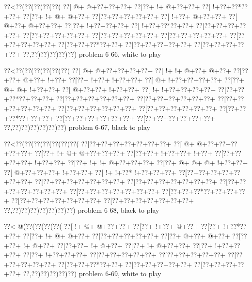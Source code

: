 \vbox{\vbox{\goo
\0??<\0??(\0??(\0??(\0??(\0??(
\0??[\- @+\- @+\0??+\0??+\0??+
\0??[\0??+\- !+\- @+\0??+\0??+
\0??[\- !+\0??+\0??*\0??+\0??+
\0??[\0??+\- !+\- @+\- @+\0??+
\0??[\0??+\0??+\0??+\0??+\0??+
\0??[\- !+\0??+\- @+\0??+\0??+
\0??[\- @+\0??+\- @+\0??+\0??+
\0??[\0??+\- !+\0??+\0??+\0??+
\0??[\- !+\0??+\0??*\0??+\0??+
\0??[\0??+\0??+\0??+\0??+\0??+
\0??[\0??+\0??+\0??+\0??+\0??+
\0??[\0??+\0??+\0??+\0??+\0??+
\0??[\0??+\0??+\0??+\0??+\0??+
\0??[\0??+\0??+\0??+\0??+\0??+
\0??[\0??+\0??+\0??*\0??+\0??+
\0??[\0??+\0??+\0??+\0??+\0??+
\0??[\0??+\0??+\0??+\0??+\0??+
\0??,\0??)\0??)\0??)\0??)\0??)
}
\hfil problem 6-66, white to play\hfil\break
}

\vbox{\vbox{\goo
\0??<\0??(\0??(\0??(\0??(\0??(\0??(
\0??[\- @+\- @+\0??+\0??+\0??+\0??+
\0??[\- !+\- !+\- @+\0??+\- @+\0??+
\0??[\0??+\0??+\- @+\0??+\- !+\0??+
\0??[\0??+\- !+\0??+\- !+\0??+\0??+
\0??[\- @+\- !+\0??+\0??+\0??+\0??+
\0??[\0??+\- @+\- @+\- !+\0??+\0??+
\0??[\- @+\0??+\0??+\- !+\0??+\0??+
\0??[\- !+\- !+\0??+\0??+\0??+\0??+
\0??[\0??+\0??+\0??*\0??+\0??+\0??+
\0??[\0??+\0??+\0??+\0??+\0??+\0??+
\0??[\0??+\0??+\0??+\0??+\0??+\0??+
\0??[\0??+\0??+\0??+\0??+\0??+\0??+
\0??[\0??+\0??+\0??+\0??+\0??+\0??+
\0??[\0??+\0??+\0??+\0??+\0??+\0??+
\0??[\0??+\0??+\0??*\0??+\0??+\0??+
\0??[\0??+\0??+\0??+\0??+\0??+\0??+
\0??[\0??+\0??+\0??+\0??+\0??+\0??+
\0??,\0??)\0??)\0??)\0??)\0??)\0??)
}
\hfil problem 6-67, black to play\hfil\break
}

\vbox{\vbox{\goo
\0??<\0??(\0??(\0??(\0??(\0??(\0??(\0??(
\0??[\0??+\0??+\0??+\0??+\0??+\0??+\0??+
\0??[\- @+\- @+\0??+\0??+\0??+\0??+\0??+
\0??[\0??+\- !+\- @+\- @+\0??+\0??+\0??+
\0??[\0??+\0??+\- !+\0??+\0??+\- !+\0??+
\0??[\0??+\0??+\0??+\0??+\- !+\0??+\0??+
\0??[\0??+\- !+\- !+\- @+\0??+\0??+\0??+
\0??[\0??+\- @+\- @+\- @+\- !+\0??+\0??+
\0??[\- @+\0??+\0??+\0??+\- !+\0??+\0??+
\0??[\- !+\- !+\0??*\- !+\0??+\0??+\0??+
\0??[\0??+\0??+\0??+\0??+\0??+\0??+\0??+
\0??[\0??+\0??+\0??+\0??+\0??+\0??+\0??+
\0??[\0??+\0??+\0??+\0??+\0??+\0??+\0??+
\0??[\0??+\0??+\0??+\0??+\0??+\0??+\0??+
\0??[\0??+\0??+\0??+\0??+\0??+\0??+\0??+
\0??[\0??+\0??+\0??*\0??+\0??+\0??+\0??+
\0??[\0??+\0??+\0??+\0??+\0??+\0??+\0??+
\0??[\0??+\0??+\0??+\0??+\0??+\0??+\0??+
\0??,\0??)\0??)\0??)\0??)\0??)\0??)\0??)
}
\hfil problem 6-68, black to play\hfil\break
}

\vbox{\vbox{\goo
\0??<\- @(\0??(\0??(\0??(\0??(
\0??[\- !+\- @+\- @+\0??+\0??+
\0??[\0??+\- !+\0??+\- @+\0??+
\0??[\0??+\- !+\0??*\0??+\0??+
\0??[\0??+\- !+\- @+\- @+\0??+
\0??[\0??+\0??+\0??+\0??+\0??+
\0??[\0??+\- @+\0??+\- @+\0??+
\0??[\0??+\0??+\- !+\- @+\0??+
\0??[\0??+\0??+\- !+\- @+\0??+
\0??[\0??+\- !+\- @+\0??+\0??+
\0??[\0??+\- !+\0??+\0??+\0??+
\0??[\0??+\- !+\0??+\0??+\0??+
\0??[\0??+\0??+\0??+\0??+\0??+
\0??[\0??+\0??+\0??+\0??+\0??+
\0??[\0??+\0??+\0??+\0??+\0??+
\0??[\0??+\0??+\0??*\0??+\0??+
\0??[\0??+\0??+\0??+\0??+\0??+
\0??[\0??+\0??+\0??+\0??+\0??+
\0??,\0??)\0??)\0??)\0??)\0??)
}
\hfil problem 6-69, white to play\hfil\break
}

